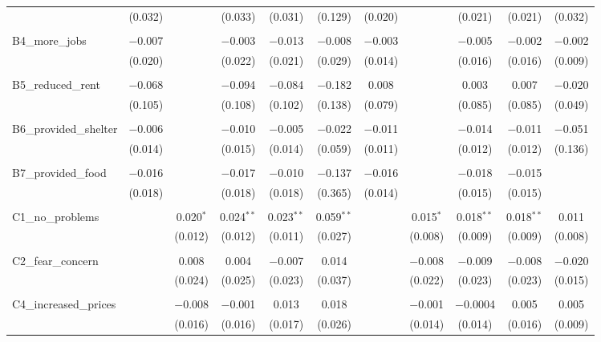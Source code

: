 \begin{table}[H]
\begin{tabular}{@{\extracolsep{4pt}}lcccccccccc}
  & (0.032) &  & (0.033) & (0.031) & (0.129) & (0.020) &  & (0.021) & (0.021) & (0.032) \\ 
  & & & & & & & & & & \\ 
 B4\_more\_jobs & $-$0.007 &  & $-$0.003 & $-$0.013 & $-$0.008 & $-$0.003 &  & $-$0.005 & $-$0.002 & $-$0.002 \\ 
  & (0.020) &  & (0.022) & (0.021) & (0.029) & (0.014) &  & (0.016) & (0.016) & (0.009) \\ 
  & & & & & & & & & & \\ 
 B5\_reduced\_rent & $-$0.068 &  & $-$0.094 & $-$0.084 & $-$0.182 & 0.008 &  & 0.003 & 0.007 & $-$0.020 \\ 
  & (0.105) &  & (0.108) & (0.102) & (0.138) & (0.079) &  & (0.085) & (0.085) & (0.049) \\ 
  & & & & & & & & & & \\ 
 B6\_provided\_shelter & $-$0.006 &  & $-$0.010 & $-$0.005 & $-$0.022 & $-$0.011 &  & $-$0.014 & $-$0.011 & $-$0.051 \\ 
  & (0.014) &  & (0.015) & (0.014) & (0.059) & (0.011) &  & (0.012) & (0.012) & (0.136) \\ 
  & & & & & & & & & & \\ 
 B7\_provided\_food & $-$0.016 &  & $-$0.017 & $-$0.010 & $-$0.137 & $-$0.016 &  & $-$0.018 & $-$0.015 &  \\ 
  & (0.018) &  & (0.018) & (0.018) & (0.365) & (0.014) &  & (0.015) & (0.015) &  \\ 
  & & & & & & & & & & \\ 
 C1\_no\_problems &  & 0.020$^{*}$ & 0.024$^{**}$ & 0.023$^{**}$ & 0.059$^{**}$ &  & 0.015$^{*}$ & 0.018$^{**}$ & 0.018$^{**}$ & 0.011 \\ 
  &  & (0.012) & (0.012) & (0.011) & (0.027) &  & (0.008) & (0.009) & (0.009) & (0.008) \\ 
  & & & & & & & & & & \\ 
 C2\_fear\_concern &  & 0.008 & 0.004 & $-$0.007 & 0.014 &  & $-$0.008 & $-$0.009 & $-$0.008 & $-$0.020 \\ 
  &  & (0.024) & (0.025) & (0.023) & (0.037) &  & (0.022) & (0.023) & (0.023) & (0.015) \\ 
  & & & & & & & & & & \\ 
 C4\_increased\_prices &  & $-$0.008 & $-$0.001 & 0.013 & 0.018 &  & $-$0.001 & $-$0.0004 & 0.005 & 0.005 \\ 
  &  & (0.016) & (0.016) & (0.017) & (0.026) &  & (0.014) & (0.014) & (0.016) & (0.009) \\ 

\end{tabular}
\end{table}
